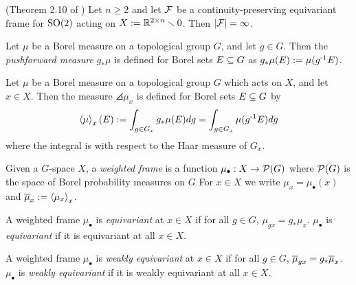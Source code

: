 \begin{theorem}\label{thm:SO-frame-infinite-card}
    (Theorem 2.10 of \cite{dym2024equivariant})
    Let $n \geq 2$ and let $\FF$ be a continuity-preserving equivariant frame for $\SO(2)$ acting on $X := \R^{2 \times n} \sminus 0$.
    Then $\card{\FF} = \infty$.
\end{theorem}

\begin{definition}
    Let $\mu$ be a Borel measure on a topological group $G$, and let $g \in G$.
    Then the \emph{pushforward measure} $g_* \mu$ is defined for Borel sets $E \sub G$ as $g_* \mu(E) := \mu(\inv{g}E)$.
\end{definition}

\begin{definition}
    Let $\mu$ be a Borel measure on a topological group $G$ which acts on $X$, and let $x \in X$.
    Then the measure $\angles{\mu}_x$ is defined for Borel sets $E \sub G$ by
    \[
        \angles{\mu}_x(E)
        := \int_{g \in G_x} g_* \mu(E) dg
        = \int_{g \in G_x} \mu(\inv{g}E) dg
    \]
    where the integral is with respect to the Haar measure of $G_x$.
\end{definition}

\begin{definition}
    Given a $G$-space $X$, a \emph{weighted frame} is a function $\mu_\bullet : X \to \PP(G)$ where $\PP(G)$ is the space of Borel probability measures on $G$
    For $x \in X$ we write $\mu_x = \mu_\bullet(x)$ and $\Bar{\mu}_x := \angles{\mu_x}_x$.
\end{definition}

\begin{definition}
    A weighted frame $\mu_\bullet$ is \emph{equivariant} at $x \in X$ if for all $g \in G$, $\mu_{gx} = g_* \mu_x$.
    $\mu_\bullet$ is \emph{equivariant} if it is equivariant at all $x \in X$.
\end{definition}

\begin{definition}
    A weighted frame $\mu_\bullet$ is \emph{weakly equivariant} at $x \in X$ if for all $g \in G$, $\Bar{\mu}_{gx} = g_* \Bar{\mu}_x$.
    $\mu_\bullet$ is \emph{weakly equivariant} if it is weakly equivariant at all $x \in X$.
\end{definition}

